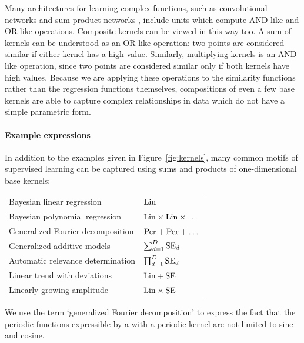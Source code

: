 \documentclass[twoside]{article}
\begin{document}
Many architectures for learning complex functions, such as convolutional networks  and sum-product networks , include units which compute AND-like and OR-like operations.
Composite kernels can be viewed in this way too. A sum of kernels can be understood as an OR-like operation: two points are considered similar if either kernel has a high value.
Similarly, multiplying kernels is an AND-like operation, since two points are considered similar only if both kernels have high values.
Because we are applying these operations to the similarity functions rather than the regression functions themselves, compositions of even a few base kernels are able to capture complex relationships in data which do not have a simple parametric form.

\paragraph{Example expressions}

In addition to the examples given in Figure~\ref{fig:kernels}, many common motifs of supervised learning can be captured using sums and products of one-dimensional base kernels:

\begin{tabular}{l|l}
Bayesian linear regression & $\textrm{Lin}$ \\
Bayesian polynomial regression & $\textrm{Lin} \times \textrm{Lin} \times \ldots$\\
Generalized Fourier decomposition & $\textrm{Per} + \textrm{Per} + \ldots$ \\
Generalized additive models & $\sum_{d=1}^D \textrm{SE}_d$ \\
Automatic relevance determination & $\prod_{d=1}^D \textrm{SE}_d$ \\
Linear trend with deviations & $\textrm{Lin} + \textrm{SE}$ \\
Linearly growing amplitude & $\textrm{Lin} \times \textrm{SE}$
\end{tabular}

We use the term `generalized Fourier decomposition' to express the fact that the periodic functions expressible by a \gp{} with a periodic kernel are not limited to sine and cosine.



\end{document}

